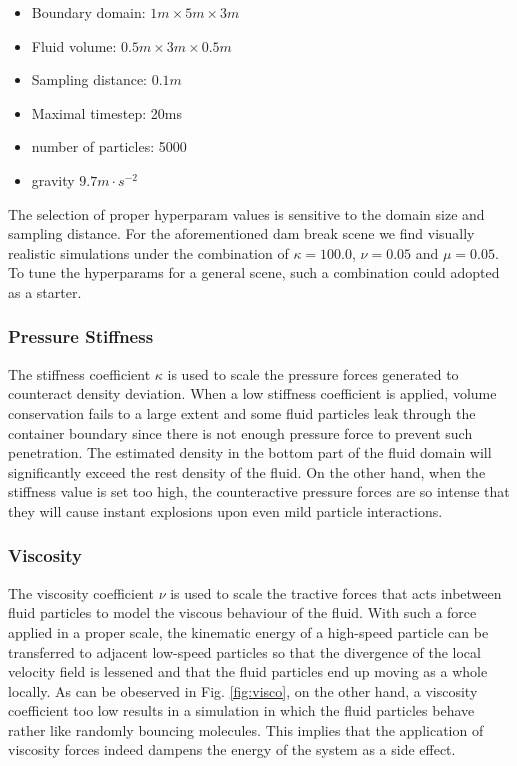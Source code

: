 \documentclass[
	11pt, 
	DIV10,
	ngerman,
	a4paper, 
	oneside, 
	headings=normal, 
	captions=tableheading,
	final, 
	numbers=noenddot
]{scrartcl}
\begin{document}
\begin{itemize}
    \item Boundary domain: $ 1m \times 5m \times 3m $
    \item Fluid volume: $ 0.5m \times 3m \times 0.5m $
    \item Sampling distance: $ 0.1m $
    \item Maximal timestep: 20ms
    \item number of particles: 5000
    \item gravity $ 9.7 m \cdot s^{-2} $
\end{itemize}

The selection of proper hyperparam values is sensitive to the domain size and sampling distance. For the aforementioned dam break scene we find visually realistic simulations under the combination of $ \kappa = 100.0 $, $ \nu = 0.05 $ and $ \mu = 0.05 $. To tune the hyperparams for a general scene, such a combination could adopted as a starter.

\subsubsection{Pressure Stiffness}

The stiffness coefficient $ \kappa $ is used to scale the pressure forces generated to counteract density deviation. When a low stiffness coefficient is applied, volume conservation fails to a large extent and some fluid particles leak through the container boundary since there is not enough pressure force to prevent such penetration. The estimated density in the bottom part of the fluid domain will significantly exceed the rest density of the fluid. On the other hand, when the stiffness value is set too high, the counteractive pressure forces are so intense that they will cause instant explosions upon even mild particle interactions.

\subsubsection{Viscosity}
The viscosity coefficient $ \nu $ is used to scale the tractive forces that acts inbetween fluid particles to model the viscous behaviour of the fluid. With such a force applied in a proper scale, the kinematic energy of a high-speed particle can be transferred to adjacent low-speed particles so that the divergence of the local velocity field is lessened and that the fluid particles end up moving as a whole locally. As can be obeserved in Fig. \ref{fig:visco}, on the other hand, a viscosity coefficient too low results in a simulation in which the fluid particles behave rather like randomly bouncing molecules. This implies that the application of viscosity forces indeed dampens the energy of the system as a side effect.
\end{document}
